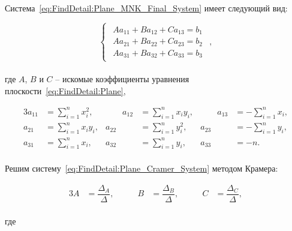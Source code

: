 Система~\ref{eq:FindDetail:Plane_MNK_Final_System} имеет следующий вид:

\begin{equation}
    \label{eq:FindDetail:Plane_Cramer_System}
    \begin{cases}
        \begin{aligned}
            A a_{11} + B a_{12} + C a_{13} = b_1 \\
            A a_{21} + B a_{22} + C a_{23} = b_2 \\
            A a_{31} + B a_{32} + C a_{33} = b_3
        \end{aligned}
    \end{cases},
\end{equation} \\
где $A$, $B$ и $C$ -- искомые коэффициенты уравнения плоскости~\ref{eq:FindDetail:Plane},

\begin{alignat*}{3}
    a_{11} &= \sum_{i=1}^{n} x_i^2, & \qquad
    a_{12} &= \sum_{i=1}^{n} x_i y_i, & \qquad
    a_{13} &= - \sum_{i=1}^{n} x_i, \\
    a_{21} &= \sum_{i=1}^{n} x_i y_i, &
    a_{22} &= \sum_{i=1}^{n} y_i^2, &
    a_{23} &= - \sum_{i=1}^{n} y_i, \\
    a_{31} &= \sum_{i=1}^{n} x_i, &
    a_{32} &= \sum_{i=1}^{n} y_i, &
    a_{33} &= - n.
\end{alignat*} \\

Решим систему~\ref{eq:FindDetail:Plane_Cramer_System} методом Крамера:

\begin{alignat*}{3}
    A &= \dfrac{\Delta_A}{\Delta}, & \qquad
    B &= \dfrac{\Delta_B}{\Delta}, & \qquad
    C &= \dfrac{\Delta_C}{\Delta},
\end{alignat*} \\
где


